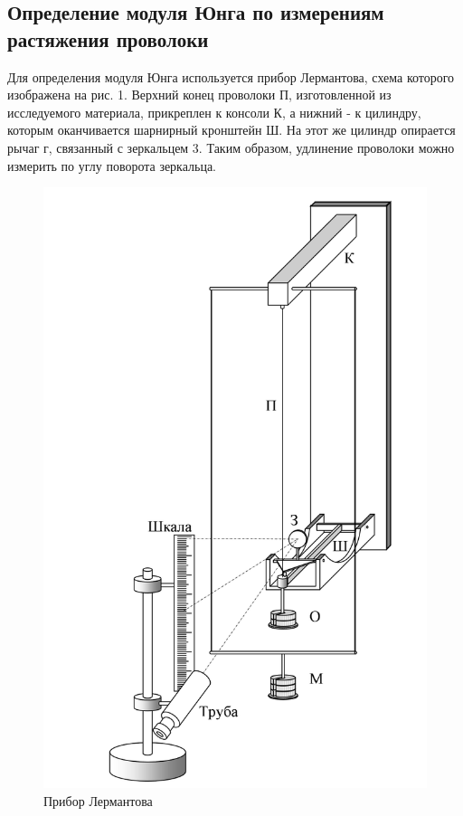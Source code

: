 \documentclass[a4paper,12 pt]{article}
\begin{document}
\subsection{Определение модуля Юнга по измерениям растяжения проволоки}

Для определения модуля Юнга используется прибор Лермантова, схема которого изображена на рис. 1. Верхний конец проволоки П, изготовленной из исследуемого материала, прикреплен к консоли К, а нижний - к цилиндру, которым оканчивается шарнирный кронштейн Ш. На этот же цилиндр опирается рычаг г, связанный с зеркальцем 3. Таким образом, удлинение проволоки можно измерить по углу поворота зеркальца.
\begin{figure}[H]
    \centering
    \includegraphics[scale = 0.4]{lermantov.png}
    \caption{Прибор Лермантова}
\end{figure}
\end{document}
